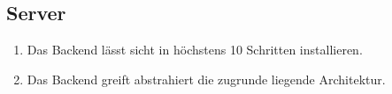 \subsection{Server}

\begin{enumerate}
    \item Das Backend lässt sicht in höchstens 10 Schritten installieren.
    \item Das Backend greift abstrahiert die zugrunde liegende Architektur.
\end{enumerate}